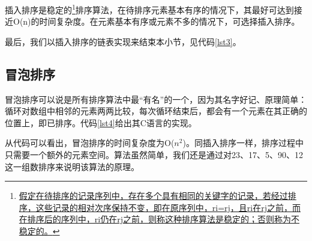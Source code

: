 \documentclass[a4paper, 12pt, titlepage]{article}
\newlength{\du}
\begin{document}
\begin{figure}[H]
\begin{center}
  \end{center}
  \caption{}
  \label{fig7}
\end{figure}

插入排序是稳定的\footnote{\href{http://baike.baidu.com/view/547325.htm?fr=aladdin}{假定在待排序的记录序列中，存在多个具有相同的关键字的记录，若经过排序，这些记录的相对次序保持不变，即在原序列中，ri=rj，且ri在rj之前，而在排序后的序列中，ri仍在rj之前，则称这种排序算法是稳定的；否则称为不稳定的。}}排序算法，在待排序元素基本有序的情况下，其最好可达到接近O(n)的时间复杂度。在元素基本有序或元素不多的情况下，可选择插入排序。

最后，我们以插入排序的链表实现来结束本小节，见代码\ref{lst3}。
\begin{spacing}{1.0}
  
\end{spacing}

\subsection{冒泡排序}
冒泡排序可以说是所有排序算法中最“有名”的一个，因为其名字好记、原理简单：循环对数组中相邻的元素两两比较，每次循环结束后，都会有一个元素在其正确的位置上，即已排序。代码\ref{lst4}给出其C语言的实现。
\begin{spacing}{1.0}
  
\end{spacing}

从代码可以看出，冒泡排序的时间复杂度为O($n^2$)。同插入排序一样，排序过程中只需要一个额外的元素空间。算法虽然简单，我们还是通过对23、17、5、90、12这一组数排序来说明该算法的原理。
\end{document}
